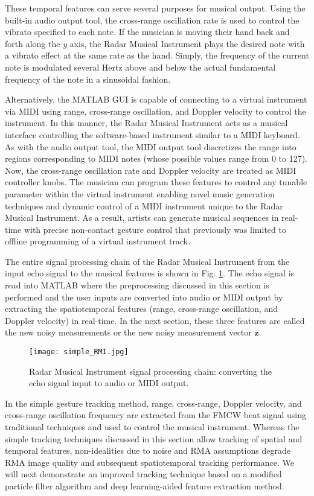 \documentclass[10pt,journal,final]{IEEEtran}
\begin{document}
These temporal features can serve several purposes for musical output. Using the built-in audio output tool, the cross-range oscillation rate is used to control the vibrato specified to each note. If the musician is moving their hand back and forth along the $y$ axis, the Radar Musical Instrument plays the desired note with a vibrato effect at the same rate as the hand. Simply, the frequency of the current note is modulated several Hertz above and below the actual fundamental frequency of the note in a sinusoidal fashion.

Alternatively, the MATLAB GUI is capable of connecting to a virtual instrument via MIDI using range, cross-range oscillation, and Doppler velocity to control the instrument. In this manner, the Radar Musical Instrument acts as a musical interface controlling the software-based instrument similar to a MIDI keyboard. As with the audio output tool, the MIDI output tool discretizes the range into regions corresponding to MIDI notes (whose possible values range from 0 to 127). Now, the cross-range oscillation rate and Doppler velocity are treated as MIDI controller knobs. The musician can program these features to control any tunable parameter within the virtual instrument enabling novel music generation techniques and dynamic control of a MIDI instrument unique to the Radar Musical Instrument. As a result, artists can generate musical sequences in real-time with precise non-contact gesture control that previously was limited to offline programming of a virtual instrument track.

The entire signal processing chain of the Radar Musical Instrument from the input echo signal to the musical features is shown in Fig. \ref{fig:simple_signal_chain}. The echo signal is read into MATLAB where the preprocessing discussed in this section is performed and the user inputs are converted into audio or MIDI output by extracting the spatiotemporal features (range, cross-range oscillation, and Doppler velocity) in real-time. In the next section, these three features are called the new noisy measurements or the new noisy measurement vector $\bm{z}$.

\begin{figure}[h]
	\centering
	\texttt{[image: simple\_RMI.jpg]}
	\caption{Radar Musical Instrument signal processing chain: converting the echo signal input to audio or MIDI output.}
	\label{fig:simple_signal_chain}
\end{figure}

In the simple gesture tracking method, range, cross-range, Doppler velocity, and cross-range oscillation frequency are extracted from the FMCW beat signal using traditional techniques and used to control the musical instrument. Whereas the simple tracking techniques discussed in this section allow tracking of spatial and temporal features, non-idealities due to noise and RMA assumptions degrade RMA image quality and subsequent spatiotemporal tracking performance. We will next demonstrate an improved tracking technique based on a modified particle filter algorithm and deep learning-aided feature extraction method.
\end{document}
